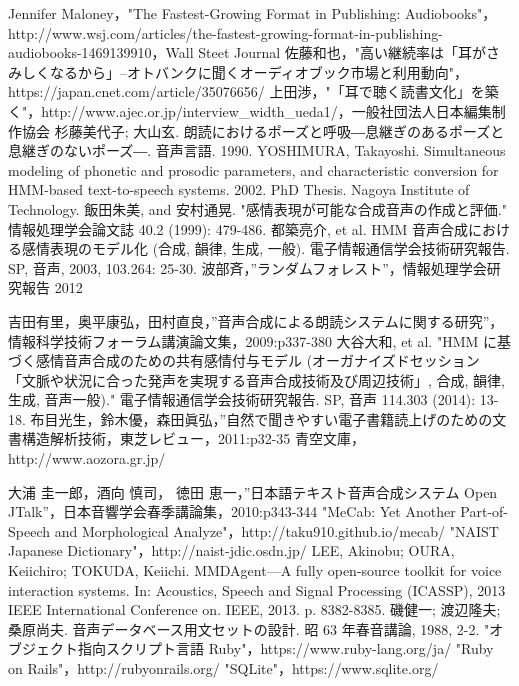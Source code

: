 \begin{thebibliography}{99}

 Jennifer Maloney，"The Fastest-Growing Format in Publishing: Audiobooks"，http://www.wsj.com/articles/the-fastest-growing-format-in-publishing-audiobooks-1469139910，Wall Steet Journal
 佐藤和也，"高い継続率は「耳がさみしくなるから」--オトバンクに聞くオーディオブック市場と利用動向"，https://japan.cnet.com/article/35076656/
 上田渉，"「耳で聴く読書文化」を築く"，http://www.ajec.or.jp/interview\_width\_ueda1/，一般社団法人日本編集制作協会
 杉藤美代子; 大山玄. 朗読におけるポーズと呼吸―息継ぎのあるポーズと息継ぎのないポーズ―. 音声言語. 1990.
 YOSHIMURA, Takayoshi. Simultaneous modeling of phonetic and prosodic parameters, and characteristic conversion for HMM-based text-to-speech systems. 2002. PhD Thesis. Nagoya Institute of Technology.
 飯田朱美, and 安村通晃. "感情表現が可能な合成音声の作成と評価." 情報処理学会論文誌 40.2 (1999): 479-486.
 都築亮介, et al. HMM 音声合成における感情表現のモデル化 (合成, 韻律, 生成, 一般). 電子情報通信学会技術研究報告. SP, 音声, 2003, 103.264: 25-30.
 波部斉，”ランダムフォレスト”，情報処理学会研究報告 2012

 吉田有里，奥平康弘，田村直良，”音声合成による朗読システムに関する研究”，情報科学技術フォーラム講演論文集，2009:p337-380
 大谷大和, et al. "HMM に基づく感情音声合成のための共有感情付与モデル (オーガナイズドセッション 「文脈や状況に合った発声を実現する音声合成技術及び周辺技術」, 合成, 韻律, 生成, 音声一般)." 電子情報通信学会技術研究報告. SP, 音声 114.303 (2014): 13-18.
 布目光生，鈴木優，森田眞弘，”自然で聞きやすい電子書籍読上げのための文書構造解析技術，東芝レビュー，2011:p32-35
 青空文庫，http://www.aozora.gr.jp/

 大浦 圭一郎，酒向 慎司， 徳田 恵一，”日本語テキスト音声合成システム Open JTalk”，日本音響学会春季講論集，2010:p343-344
 "MeCab: Yet Another Part-of-Speech and Morphological Analyze"，http://taku910.github.io/mecab/
 "NAIST Japanese Dictionary"，http://naist-jdic.osdn.jp/
 LEE, Akinobu; OURA, Keiichiro; TOKUDA, Keiichi. MMDAgent—A fully open-source toolkit for voice interaction systems. In: Acoustics, Speech and Signal Processing (ICASSP), 2013 IEEE International Conference on. IEEE, 2013. p. 8382-8385.
 磯健一; 渡辺隆夫; 桑原尚夫. 音声データベース用文セットの設計. 昭 63 年春音講論, 1988, 2-2.
 "オブジェクト指向スクリプト言語 Ruby"，https://www.ruby-lang.org/ja/
 "Ruby on Rails"，http://rubyonrails.org/
 "SQLite"，https://www.sqlite.org/

\end{thebibliography}
